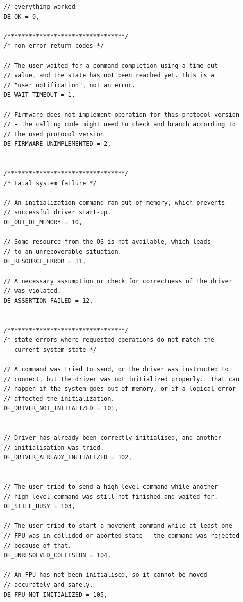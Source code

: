 \documentclass[11pt,a4paper]{scrartcl}
\begin{document}
\begin{verbatim}
    // everything worked
    DE_OK = 0,

    /*********************************/
    /* non-error return codes */

    // The user waited for a command completion using a time-out
    // value, and the state has not been reached yet. This is a
    // "user notification", not an error.
    DE_WAIT_TIMEOUT = 1,

    // Firmware does not implement operation for this protocol version
    // - the calling code might need to check and branch according to
    // the used protocol version
    DE_FIRMWARE_UNIMPLEMENTED = 2,


    /*********************************/
    /* Fatal system failure */

    // An initialization command ran out of memory, which prevents
    // successful driver start-up.
    DE_OUT_OF_MEMORY = 10,

    // Some resource from the OS is not available, which leads
    // to an unrecoverable situation.
    DE_RESOURCE_ERROR = 11,

    // A necessary assumption or check for correctness of the driver
    // was violated.
    DE_ASSERTION_FAILED = 12,


    /*********************************/
    /* state errors where requested operations do not match the
       current system state */

    // A command was tried to send, or the driver was instructed to
    // connect, but the driver was not initialized properly.  That can
    // happen if the system goes out of memory, or if a logical error
    // affected the initialization.
    DE_DRIVER_NOT_INITIALIZED = 101,


    // Driver has already been correctly initialised, and another
    // initialisation was tried.
    DE_DRIVER_ALREADY_INITIALIZED = 102,


    // The user tried to send a high-level command while another
    // high-level command was still not finished and waited for.
    DE_STILL_BUSY = 103,

    // The user tried to start a movement command while at least one
    // FPU was in collided or aborted state - the command was rejected
    // because of that.
    DE_UNRESOLVED_COLLISION = 104,

    // An FPU has not been initialised, so it cannot be moved
    // accurately and safely.
    DE_FPU_NOT_INITIALIZED = 105,


\end{verbatim}
\end{document}
